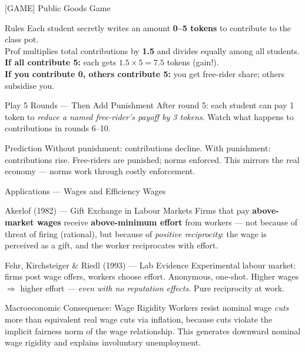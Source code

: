 \documentclass[aspectratio=169]{beamer}
\begin{document}
\begin{frame}{[GAME] Public Goods Game}
\begin{alertblock}{Rules}
Each student secretly writes an amount \textbf{0--5 tokens} to contribute to the class pot. \\
Prof multiplies total contributions by \textbf{1.5} and divides equally among all students.\\[0.3em]
\textbf{If all contribute 5:} each gets $1.5 \times 5 = 7.5$ tokens (gain!).\\
\textbf{If you contribute 0, others contribute 5:} you get free-rider share; others subsidise you.
\end{alertblock}
\begin{block}{Play 5 Rounds --- Then Add Punishment}
After round 5: each student can pay 1 token to \textit{reduce a named free-rider's payoff by 3 tokens}. Watch what happens to contributions in rounds 6--10.
\end{block}
\begin{exampleblock}{Prediction}
Without punishment: contributions decline. With punishment: contributions rise. Free-riders are punished; norms enforced. This mirrors the real economy --- norms work through costly enforcement.
\end{exampleblock}
\end{frame}

\begin{frame}{Applications --- Wages and Efficiency Wages}
\begin{block}{Akerlof (1982) --- Gift Exchange in Labour Markets}
Firms that pay \textbf{above-market wages} receive \textbf{above-minimum effort} from workers --- not because of threat of firing (rational), but because of \textit{positive reciprocity}: the wage is perceived as a gift, and the worker reciprocates with effort.
\end{block}
\begin{exampleblock}{Fehr, Kirchsteiger \& Riedl (1993) --- Lab Evidence}
Experimental labour market: firms post wage offers, workers choose effort. Anonymous, one-shot. Higher wages $\Rightarrow$ higher effort --- \textit{even with no reputation effects.} Pure reciprocity at work.
\end{exampleblock}
\begin{alertblock}{Macroeconomic Consequence: Wage Rigidity}
Workers resist nominal wage \textit{cuts} more than equivalent real wage cuts via inflation, because cuts violate the implicit fairness norm of the wage relationship. This generates downward nominal wage rigidity and explains involuntary unemployment.
\end{alertblock}
\end{frame}
\end{document}
